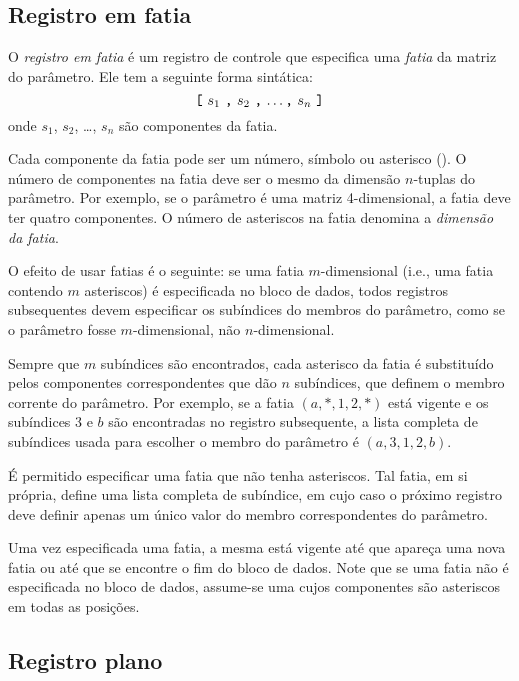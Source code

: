 \documentclass[11pt, brazil]{report}
\begin{document}

\subsection{Registro em fatia}

O {\it registro em fatia} é um registro de controle que especifica uma
{\it fatia} da matriz do parâmetro. Ele tem a seguinte forma sintática:
$$\mbox{{\tt[} $s_1$ {\tt,} $s_2$ {\tt,} \dots {\tt,} $s_n$ {\tt]}}$$
onde $s_1$, $s_2$, \dots, $s_n$ são componentes da fatia.

Cada componente da fatia pode ser um número, símbolo ou asterisco
({\tt*}). O número de componentes na fatia deve ser o mesmo da
dimensão $n$-tuplas do parâmetro. Por exemplo,
se o parâmetro é uma matriz 4-dimensional, a fatia deve ter
quatro componentes. O número de \linebreak asteriscos na fatia denomina a
{\it dimensão da fatia}.

O efeito de usar fatias é o seguinte: se uma fatia $m$-dimensional
(i.e., uma fatia contendo $m$ asteriscos) é especificada no bloco de dados,
todos registros subsequentes devem especificar os subíndices do membros do
parâmetro, como se o parâmetro fosse $m$-dimensional, não $n$-dimensional.

Sempre que $m$ subíndices são encontrados, cada asterisco da fatia é substituído
pelos \linebreak componentes correspondentes que dão $n$ subíndices, que definem o
membro corrente do parâmetro.
Por exemplo, se a fatia $(a,*,1,2,*)$ está vigente e os subíndices 3 e
$b$ são encontradas no \linebreak registro subsequente, a lista completa de subíndices
usada para escolher o membro do parâmetro é $(a,3,1,2,b)$.


É permitido especificar uma fatia que não tenha asteriscos. Tal fatia, em si
própria, define uma lista completa de subíndice, em cujo caso o próximo
registro deve definir apenas um único valor do membro correspondentes do parâmetro.

Uma vez especificada uma fatia, a mesma está vigente até que apareça uma nova
fatia ou até que se encontre o fim do bloco de dados. Note que se uma fatia
não é especificada no bloco de dados, assume-se uma cujos componentes são
asteriscos em todas as posições.


\subsection{Registro plano}
\end{document}
